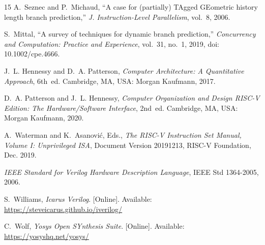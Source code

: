 \documentclass[conference]{IEEEtran}
\begin{document}
\begin{thebibliography}{15}
A.~Seznec and P.~Michaud, ``A case for (partially) TAgged GEometric history length branch
prediction,'' \emph{J. Instruction-Level Parallelism}, vol.~8, 2006.

S.~Mittal, ``A survey of techniques for dynamic branch prediction,'' \emph{Concurrency and
Computation: Practice and Experience}, vol.~31, no.~1, 2019, doi: 10.1002/cpe.4666.

J.~L. Hennessy and D.~A. Patterson, \emph{Computer Architecture: A Quantitative Approach}, 6th~ed.
Cambridge, MA, USA: Morgan Kaufmann, 2017.

D.~A. Patterson and J.~L. Hennessy, \emph{Computer Organization and Design RISC-V Edition: The
Hardware/Software Interface}, 2nd~ed. Cambridge, MA, USA: Morgan Kaufmann, 2020.

A.~Waterman and K.~Asanovi\'c, Eds., \emph{The RISC-V Instruction Set Manual, Volume I:
Unprivileged ISA}, Document Version 20191213, RISC-V Foundation, Dec. 2019.

\emph{IEEE Standard for Verilog Hardware Description Language}, IEEE Std 1364-2005, 2006.

S.~Williams, \emph{Icarus Verilog}. [Online]. Available: \url{https://steveicarus.github.io/iverilog/}

C.~Wolf, \emph{Yosys Open SYnthesis Suite}. [Online]. Available: \url{https://yosyshq.net/yosys/}
\end{thebibliography}
\end{document}
